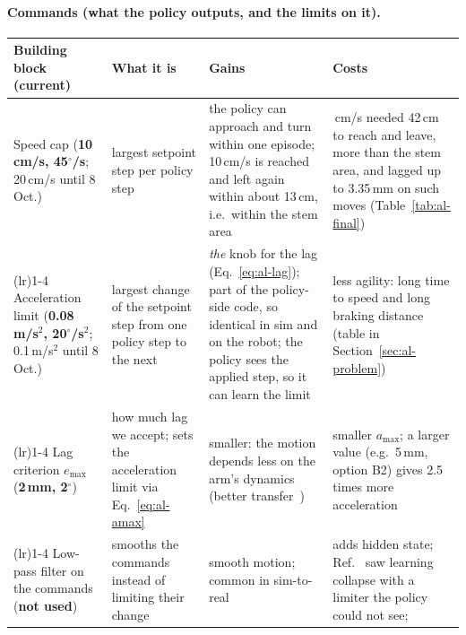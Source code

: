 \paragraph{Commands (what the policy outputs, and the limits on it).}
\begin{center}
{\small\renewcommand{\arraystretch}{1.2}
\begin{tabular}{>{\raggedright\arraybackslash}p{}>{\raggedright\arraybackslash}p{}>{\raggedright\arraybackslash}p{}>{\raggedright\arraybackslash}p{}}
  \toprule
  Building block (current) & What it is & Gains & Costs \\
  \midrule
  Speed cap \newline (\textbf{10\,cm/s, 45$^\circ$/s}; 20\,cm/s until 8 Oct.)
    & largest setpoint step per policy step
    & the policy can approach and turn within one episode; 10\,cm/s is reached and left again within about 13\,cm,
      i.e.\ within the stem area
    & 20\,cm/s needed 42\,cm to reach and leave, more than the stem area, and lagged up to 3.35\,mm on such moves
      (Table~\ref{tab:al-final}) \\
  \addlinespace\cmidrule(lr){1-4}\addlinespace
  Acceleration limit \newline (\textbf{0.08\,m/s$^2$, 20$^\circ$/s$^2$}; 0.1\,m/s$^2$ until 8 Oct.)
    & largest change of the setpoint step from one policy step to the next
    & \emph{the} knob for the lag (Eq.~\ref{eq:al-lag}); part of the policy-side code, so identical in sim and on the
      robot; the policy sees the applied step, so it can learn the limit
    & less agility: long time to speed and long braking distance (table in Section~\ref{sec:al-problem}) \\
  \addlinespace\cmidrule(lr){1-4}\addlinespace
  Lag criterion $e_\text{max}$ \newline (\textbf{2\,mm, 2$^\circ$})
    & how much lag we accept; sets the acceleration limit via Eq.~\eqref{eq:al-amax}
    & smaller: the motion depends less on the arm's dynamics (better transfer~\cite{al-aljalbout2024})
    & smaller $a_\text{max}$; a larger value (e.g.\ 5\,mm, option B2) gives 2.5 times more acceleration \\
  \addlinespace\cmidrule(lr){1-4}\addlinespace
  Low-pass filter on the commands \newline (\textbf{not used})
    & smooths the commands instead of limiting their change
    & smooth motion; common in sim-to-real
    & adds hidden state; Ref.~\cite{al-aljalbout2024} saw learning collapse with a limiter the policy could not see;

\end{tabular}}
\end{center}
